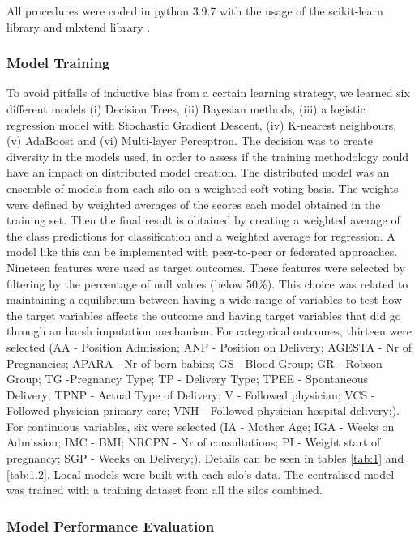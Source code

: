 All procedures were coded in python 3.9.7 with the usage of the scikit-learn library \cite{scikit-learn} and mlxtend library \cite{mlxtend}.


\subsubsection{Model Training}
To avoid pitfalls of inductive bias from a certain learning strategy, we learned six different models (i) Decision Trees, (ii) Bayesian methods, (iii) a logistic regression model with Stochastic Gradient Descent, (iv) K-nearest neighbours, (v) AdaBoost and (vi) Multi-layer Perceptron. The decision was to create diversity in the models used, in order to assess if the training methodology could have an impact on distributed model creation.
The distributed model was an ensemble of models from each silo on a weighted soft-voting basis. The weights were defined by weighted averages of the scores each model obtained in the training set. Then the final result is obtained by creating a weighted average of the class predictions for classification and a weighted average for regression. A model like this can be implemented with peer-to-peer or federated approaches.
Nineteen features were used as target outcomes. These features were selected by filtering by the percentage of null values (below 50\%). This choice was related to maintaining a equilibrium between having a wide range of variables to test how the target variables affects the outcome and having target variables that did go through an harsh imputation mechanism. For categorical outcomes, thirteen were selected (AA - Position Admission; ANP - Position on Delivery; AGESTA - Nr of Pregnancies; APARA - Nr of born babies; GS - Blood Group; GR - Robson Group; TG -Pregnancy Type; TP - Delivery Type; TPEE - Spontaneous Delivery; TPNP - Actual Type of Delivery; V - Followed physician; VCS - Followed physician primary care; VNH - Followed physician hospital delivery;). For continuous variables, six were selected (IA - Mother Age; IGA - Weeks on Admission; IMC - BMI; NRCPN - Nr of consultations; PI - Weight start of pregnancy; SGP - Weeks on Delivery;). Details can be seen in tables \ref{tab:1} and \ref{tab:1.2}.
Local models were built with each silo's data. The centralised model was trained with a training dataset from all the silos combined. 


\subsubsection{Model Performance Evaluation}

